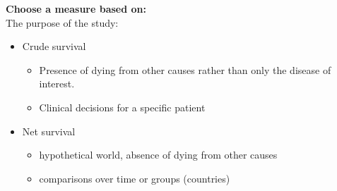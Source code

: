 \documentclass{beamer}
\begin{document}
\begin{frame}{\secname}
\textbf{Choose a measure based on:} \\
The purpose of the study: 
\begin{itemize}
    \item Crude survival \begin{itemize}
        \item Presence of dying from other causes rather than only the disease of interest.
        \item Clinical decisions for a specific patient
    \end{itemize}
    \item Net survival 
    \begin{itemize}
        \item hypothetical world, absence of dying from other causes
        \item comparisons over time or groups (countries)
            \end{itemize}
\end{itemize}
\end{frame}
\end{document}
